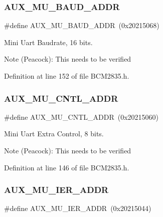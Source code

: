 \subsubsection{\texorpdfstring{A\+U\+X\+\_\+\+M\+U\+\_\+\+B\+A\+U\+D\+\_\+\+A\+D\+DR}{AUX\_MU\_BAUD\_ADDR}}
{\footnotesize\ttfamily \#define A\+U\+X\+\_\+\+M\+U\+\_\+\+B\+A\+U\+D\+\_\+\+A\+D\+DR~(0x20215068)}



Mini Uart Baudrate, 16 bits. 

\begin{DoxyNote}{Note}
(Peacock)\+: This needs to be verified 
\end{DoxyNote}


Definition at line 152 of file B\+C\+M2835.\+h.

\mbox{\label{group__UART_ga9c3d11375873d03e2bb8b93d3ae970fb}} 
\subsubsection{\texorpdfstring{A\+U\+X\+\_\+\+M\+U\+\_\+\+C\+N\+T\+L\+\_\+\+A\+D\+DR}{AUX\_MU\_CNTL\_ADDR}}
{\footnotesize\ttfamily \#define A\+U\+X\+\_\+\+M\+U\+\_\+\+C\+N\+T\+L\+\_\+\+A\+D\+DR~(0x20215060)}



Mini Uart Extra Control, 8 bits. 

\begin{DoxyNote}{Note}
(Peacock)\+: This needs to be verified 
\end{DoxyNote}


Definition at line 146 of file B\+C\+M2835.\+h.

\mbox{\label{group__UART_gab7f0b281001eba1983b44e5bd3de3624}} 
\subsubsection{\texorpdfstring{A\+U\+X\+\_\+\+M\+U\+\_\+\+I\+E\+R\+\_\+\+A\+D\+DR}{AUX\_MU\_IER\_ADDR}}
{\footnotesize\ttfamily \#define A\+U\+X\+\_\+\+M\+U\+\_\+\+I\+E\+R\+\_\+\+A\+D\+DR~(0x20215044)}



